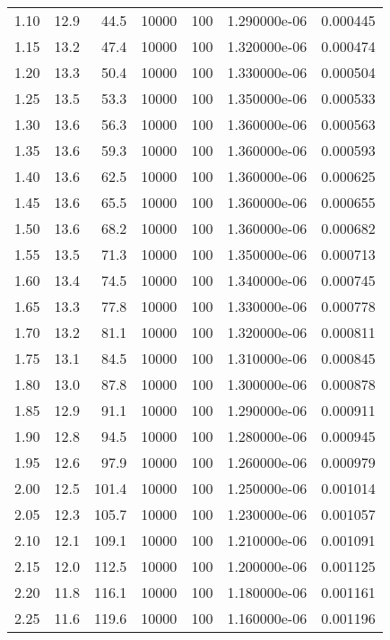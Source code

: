 \begin{tabular}{rrrrrrr}
  1.10 &     12.9 &     44.5 & 10000 & 100 & 1.290000e-06 & 0.000445 \\
  1.15 &     13.2 &     47.4 & 10000 & 100 & 1.320000e-06 & 0.000474 \\
  1.20 &     13.3 &     50.4 & 10000 & 100 & 1.330000e-06 & 0.000504 \\
  1.25 &     13.5 &     53.3 & 10000 & 100 & 1.350000e-06 & 0.000533 \\
  1.30 &     13.6 &     56.3 & 10000 & 100 & 1.360000e-06 & 0.000563 \\
  1.35 &     13.6 &     59.3 & 10000 & 100 & 1.360000e-06 & 0.000593 \\
  1.40 &     13.6 &     62.5 & 10000 & 100 & 1.360000e-06 & 0.000625 \\
  1.45 &     13.6 &     65.5 & 10000 & 100 & 1.360000e-06 & 0.000655 \\
  1.50 &     13.6 &     68.2 & 10000 & 100 & 1.360000e-06 & 0.000682 \\
  1.55 &     13.5 &     71.3 & 10000 & 100 & 1.350000e-06 & 0.000713 \\
  1.60 &     13.4 &     74.5 & 10000 & 100 & 1.340000e-06 & 0.000745 \\
  1.65 &     13.3 &     77.8 & 10000 & 100 & 1.330000e-06 & 0.000778 \\
  1.70 &     13.2 &     81.1 & 10000 & 100 & 1.320000e-06 & 0.000811 \\
  1.75 &     13.1 &     84.5 & 10000 & 100 & 1.310000e-06 & 0.000845 \\
  1.80 &     13.0 &     87.8 & 10000 & 100 & 1.300000e-06 & 0.000878 \\
  1.85 &     12.9 &     91.1 & 10000 & 100 & 1.290000e-06 & 0.000911 \\
  1.90 &     12.8 &     94.5 & 10000 & 100 & 1.280000e-06 & 0.000945 \\
  1.95 &     12.6 &     97.9 & 10000 & 100 & 1.260000e-06 & 0.000979 \\
  2.00 &     12.5 &    101.4 & 10000 & 100 & 1.250000e-06 & 0.001014 \\
  2.05 &     12.3 &    105.7 & 10000 & 100 & 1.230000e-06 & 0.001057 \\
  2.10 &     12.1 &    109.1 & 10000 & 100 & 1.210000e-06 & 0.001091 \\
  2.15 &     12.0 &    112.5 & 10000 & 100 & 1.200000e-06 & 0.001125 \\
  2.20 &     11.8 &    116.1 & 10000 & 100 & 1.180000e-06 & 0.001161 \\
  2.25 &     11.6 &    119.6 & 10000 & 100 & 1.160000e-06 & 0.001196 \\

\end{tabular}
